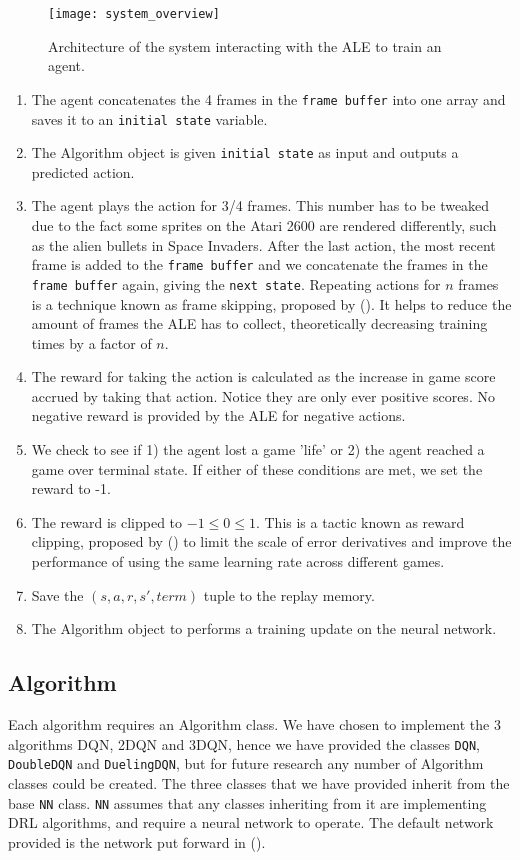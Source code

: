 \begin{figure}[H]
	\centering
	\texttt{[image: system\_overview]}
	\caption{Architecture of the system interacting with the ALE to train an agent.}
	\label{fig:sys_arch}
\end{figure}

\begin{enumerate}
	\item The agent concatenates the 4 frames in the \texttt{frame buffer} into one array and saves it to an \texttt{initial state} variable.
	\item The Algorithm object is given \texttt{initial state} as input and outputs a predicted action.
	\item The agent plays the action for 3/4 frames. This number has to be tweaked due to the fact some sprites on the Atari 2600 are rendered differently, such as the alien bullets in Space Invaders. After the last action, the most recent frame is added to the \texttt{frame buffer} and we concatenate the frames in the \texttt{frame buffer} again, giving the \texttt{next state}. Repeating actions for $n$ frames is a technique known as frame skipping, proposed by (\citet{deepmind1}). It helps to reduce the amount of frames the ALE has to collect, theoretically decreasing training times by a factor of $n$.
	\item The reward for taking the action is calculated as the increase in game score accrued by taking that action. Notice they are only ever positive scores. No negative reward is provided by the ALE for negative actions.
	\item We check to see if 1) the agent lost a game 'life' or 2) the agent reached a game over terminal state. If either of these conditions are met, we set the reward to -1.
	\item The reward is clipped to $-1 \leq 0 \leq 1$. This is a tactic known as reward clipping, proposed by (\citet{human}) to limit the scale of error derivatives and improve the performance of using the same learning rate across different games.
	\item Save the $(s, a, r, s', term)$ tuple to the replay memory.
	\item The Algorithm object to performs a training update on the neural network.
\end{enumerate}

\subsection{Algorithm}
Each algorithm requires an Algorithm class. We have chosen to implement the 3 algorithms DQN, 2DQN and 3DQN, hence we have provided the classes \texttt{DQN}, \texttt{DoubleDQN} and \texttt{DuelingDQN}, but for future research any number of Algorithm classes could be created. The three classes that we have provided inherit from the base \texttt{NN} class. \texttt{NN} assumes that any classes inheriting from it are implementing DRL algorithms, and require a neural network to operate. The default network provided is the network put forward in (\citet{human}). \paragraph{}

